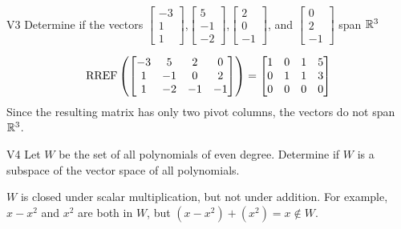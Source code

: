 \documentclass{sbgLAquiz}
\begin{document}
\begin{problem}{V3}
Determine if the vectors  $\begin{bmatrix} -3 \\ 1 \\ 1 \end{bmatrix}$,$\begin{bmatrix} 5 \\ -1 \\ -2 \end{bmatrix}$,$\begin{bmatrix}2 \\ 0 \\ -1 \end{bmatrix}$, and $\begin{bmatrix} 0 \\ 2 \\ -1\end{bmatrix}$ span $\mathbb{R}^3$
\end{problem}
\begin{solution}
$$\operatorname{RREF}\left(\begin{bmatrix}
-3 & 5 & 2 & 0 \\ 1 & -1 & 0 & 2 \\ 1 & -2 & -1 & -1 \end{bmatrix}\right)=\begin{bmatrix} 1 & 0 & 1 & 5 \\ 0 & 1 & 1 & 3 \\ 0 & 0 & 0 & 0\end{bmatrix}$$
Since the resulting matrix has only two pivot columns, the vectors do not span $\mathbb{R}^3$.
\end{solution}


\begin{extract}\newpage\end{extract}
\begin{problem}{V4} Let $W$ be the set of all polynomials of even degree.  Determine if $W$ is a subspace of the vector space of all polynomials.
\end{problem}
\begin{solution}
$W$ is closed under scalar multiplication, but not under addition.  For example, $x-x^2$ and $x^2$ are both in $W$, but $(x-x^2)+(x^2)=x \notin W$.
\end{solution}
\end{document}
